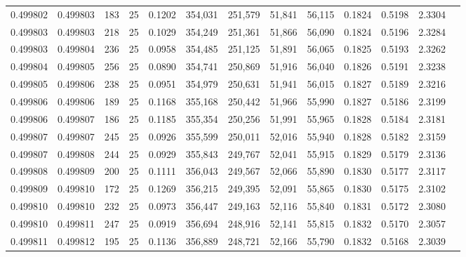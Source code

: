 \begin{tabular}{rrrrrrrrrrrrr}
0.499802 & 0.499803 & 183 &  25 &                                     0.1202 & 354,031 & 251,579 &  51,841 &  56,115 & 0.1824 & 0.5198 & 2.3304 \\
0.499803 & 0.499803 & 218 &  25 &                                     0.1029 & 354,249 & 251,361 &  51,866 &  56,090 & 0.1824 & 0.5196 & 2.3284 \\
0.499803 & 0.499804 & 236 &  25 &                                     0.0958 & 354,485 & 251,125 &  51,891 &  56,065 & 0.1825 & 0.5193 & 2.3262 \\
0.499804 & 0.499805 & 256 &  25 &                                     0.0890 & 354,741 & 250,869 &  51,916 &  56,040 & 0.1826 & 0.5191 & 2.3238 \\
0.499805 & 0.499806 & 238 &  25 &                                     0.0951 & 354,979 & 250,631 &  51,941 &  56,015 & 0.1827 & 0.5189 & 2.3216 \\
0.499806 & 0.499806 & 189 &  25 &                                     0.1168 & 355,168 & 250,442 &  51,966 &  55,990 & 0.1827 & 0.5186 & 2.3199 \\
0.499806 & 0.499807 & 186 &  25 &                                     0.1185 & 355,354 & 250,256 &  51,991 &  55,965 & 0.1828 & 0.5184 & 2.3181 \\
0.499807 & 0.499807 & 245 &  25 &                                     0.0926 & 355,599 & 250,011 &  52,016 &  55,940 & 0.1828 & 0.5182 & 2.3159 \\
0.499807 & 0.499808 & 244 &  25 &                                     0.0929 & 355,843 & 249,767 &  52,041 &  55,915 & 0.1829 & 0.5179 & 2.3136 \\
0.499808 & 0.499809 & 200 &  25 &                                     0.1111 & 356,043 & 249,567 &  52,066 &  55,890 & 0.1830 & 0.5177 & 2.3117 \\
0.499809 & 0.499810 & 172 &  25 &                                     0.1269 & 356,215 & 249,395 &  52,091 &  55,865 & 0.1830 & 0.5175 & 2.3102 \\
0.499810 & 0.499810 & 232 &  25 &                                     0.0973 & 356,447 & 249,163 &  52,116 &  55,840 & 0.1831 & 0.5172 & 2.3080 \\
0.499810 & 0.499811 & 247 &  25 &                                     0.0919 & 356,694 & 248,916 &  52,141 &  55,815 & 0.1832 & 0.5170 & 2.3057 \\
0.499811 & 0.499812 & 195 &  25 &                                     0.1136 & 356,889 & 248,721 &  52,166 &  55,790 & 0.1832 & 0.5168 & 2.3039 \\

\end{tabular}
